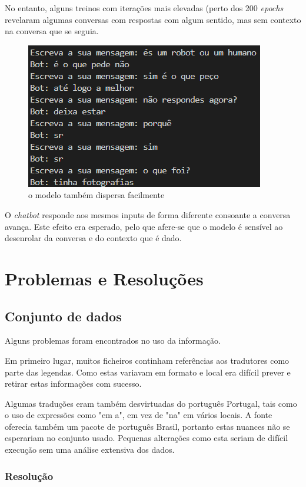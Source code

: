 \documentclass{article}
\begin{document}
No entanto, alguns treinos com iterações mais elevadas (perto dos 200 \textit{epochs} revelaram algumas conversas com respostas com algum sentido, mas sem contexto na conversa que se seguia.
\begin{figure}[htb]
    \centering
    \includegraphics[scale=0.7]{chat2}
    \caption{o modelo também dispersa facilmente}
    \label{chat3}
\end{figure}

O \textit{chatbot} responde aos mesmos inputs de forma diferente consoante a conversa avança. Este efeito era esperado, pelo que afere-se que o modelo é sensível ao desenrolar da conversa e do contexto que é dado.

\section{Problemas e Resoluções}

\subsection{Conjunto de dados}
Alguns problemas foram encontrados no uso da informação.

Em primeiro lugar, muitos ficheiros continham referências aos tradutores como parte das legendas. Como estas variavam em formato e local era difícil prever e retirar estas informações com sucesso.

Algumas traduções eram também desvirtuadas do português Portugal, tais como o uso de expressões como "em a", em vez de "na" em vários locais. A fonte oferecia também um pacote de português Brasil, portanto estas nuances não se esperariam no conjunto usado. Pequenas alterações como esta seriam de difícil execução sem uma análise extensiva dos dados.

\subsubsection{Resolução}
\end{document}
